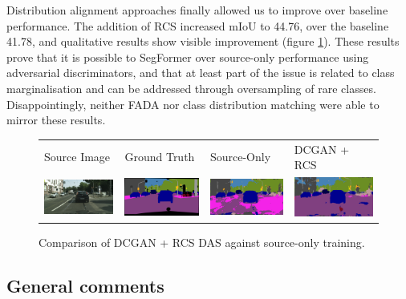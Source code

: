 \documentclass[a4paper,12pt]{report}
\begin{document}
Distribution alignment approaches finally allowed us to improve over baseline performance. The addition of RCS increased mIoU to 44.76, over the baseline 41.78, and qualitative results show visible improvement (figure \ref{fig:das-qualitative}). These results prove that it is possible to SegFormer over source-only performance using adversarial discriminators, and that at least part of the issue is related to class marginalisation and can be addressed through oversampling of rare classes. Disappointingly, neither FADA nor class distribution matching were able to mirror these results.

\begin{figure}[]
    \centering
    \begin{tabular}{llll}
        Source Image & Ground Truth & Source-Only & DCGAN + RCS \\ 
        \includegraphics[width=.2\linewidth,valign=m]{res/das-qualitative/image.png} & \includegraphics[width=.2\linewidth,valign=m]{res/das-qualitative/ground-truth.png} & \includegraphics[width=.2\linewidth,valign=m]{res/das-qualitative/source-only.png} & \includegraphics[width=.2\linewidth,valign=m]{res/das-qualitative/dcgan-rcs.png}\\
    \end{tabular}
    \caption{Comparison of DCGAN + RCS DAS against source-only training.}
    \label{fig:das-qualitative}
\end{figure}

\subsection{General comments}
\end{document}
